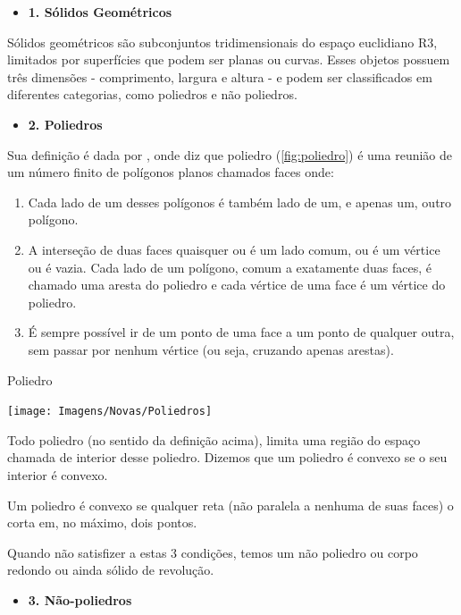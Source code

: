 \begin{itemize}
    \item \textbf{1. Sólidos Geométricos}
\end{itemize}

Sólidos geométricos são subconjuntos tridimensionais do espaço euclidiano R3, limitados por superfícies que podem ser planas ou curvas. Esses objetos possuem três dimensões - comprimento, largura e altura - e podem ser classificados em diferentes categorias, como poliedros e não poliedros.

\begin{itemize}
    \item \textbf{2. Poliedros}
\end{itemize}

Sua definição é dada por , onde diz que poliedro (\autoref{fig:poliedro}) é uma reunião de um número finito de polígonos planos chamados faces onde:

\begin{enumerate}
    \item Cada lado de um desses polígonos é também lado de um, e apenas um, outro polígono.
    \item A interseção de duas faces quaisquer ou é um lado comum, ou é um vértice ou é vazia. Cada lado de um polígono, comum a exatamente duas faces, é chamado uma aresta do poliedro e cada vértice de uma face é um vértice do poliedro.
    \item É sempre possível ir de um ponto de uma face a um ponto de qualquer outra, sem passar por nenhum vértice (ou seja, cruzando apenas arestas).
\end{enumerate}

\begin{CenteredFigure}
    \caption{Poliedro} \label{fig:poliedro}
    \texttt{[image: Imagens/Novas/Poliedros]}
\end{CenteredFigure}

Todo poliedro (no sentido da definição acima), limita uma região do espaço chamada de interior desse poliedro. Dizemos que um poliedro é convexo se o seu interior é convexo.

Um poliedro é convexo se qualquer reta (não paralela a nenhuma de suas faces) o corta em, no máximo, dois pontos.

Quando não satisfizer a estas 3 condições, temos um não poliedro ou corpo redondo ou ainda sólido de revolução.

\begin{itemize}
    \item \textbf{3. Não-poliedros}
\end{itemize}

